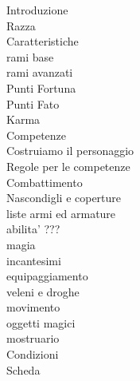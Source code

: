 \documentclass[12pt,a4paper,twoside,openany,twocolumn]{book}
\begin{document}
Introduzione\\
Razza\\
Caratteristiche\\
rami base\\
rami avanzati\\
Punti Fortuna\\
Punti Fato\\
Karma\\
Competenze\\
Costruiamo il personaggio\\
Regole per le competenze\\
Combattimento\\
Nascondigli e coperture\\
liste armi ed armature\\
abilita' ???\\
magia\\
incantesimi\\
equipaggiamento\\
veleni e droghe\\
movimento\\
oggetti magici\\
mostruario\\
Condizioni\\
Scheda\\
\end{document}
